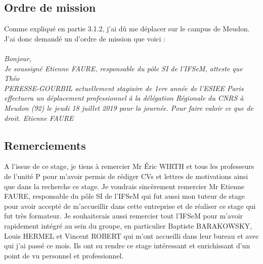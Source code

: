 \subsection{Ordre de mission}
Comme expliqué en partie 3.1.2, j'ai dû me déplacer sur le campus de Meudon. J'ai donc demandé un d'ordre de mission que voici :
\\
\\
\textit{
Bonjour,\\
Je soussigné Etienne FAURE, responsable du pôle SI de l’IFSeM, atteste que Théo \\PERESSE-GOURBIL actuellement stagiaire de 1ere année de l’ESIEE Paris effectuera un déplacement professionnel à la délégation Régionale du CNRS à Meudon (92) le jeudi 18 juillet 2019 pour la journée.
\medbreak
Pour faire valoir ce que de droit.
\smallbreak
Etienne FAURE}
\subsection{Remerciements}
A l'issue de ce stage, je tiens à remercier Mr Éric WIRTH et tous les professeurs de l'unité P pour m'avoir permis de rédiger CVs et lettres de motivations ainsi que dans la recherche ce stage. 
\smallbreak
Je voudrais sincèrement remercier Mr Etienne FAURE, responsable du pôle SI de l'IFSeM qui fut aussi mon tuteur de stage pour avoir accepté de m'accueillir dans cette entreprise et de réaliser ce stage qui fut très formateur.
\smallbreak
Je souhaiterais aussi remercier tout l'IFSeM pour m'avoir rapidement intégré au sein du groupe, en particulier Baptiste BARAKOWSKY, Louis HERMEL et Vincent ROBERT qui m'ont accueilli dans leur bureau et avec qui j'ai passé ce mois. Ils ont su rendre ce stage intéressant et enrichissant d'un point de vu personnel et professionnel.